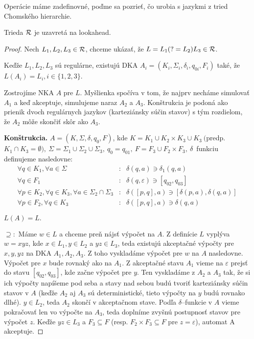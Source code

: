 Operácie máme zadefinovné, poďme sa pozrieť, čo urobia s jazykmi z tried Chomského hierarchie.

\begin{lema}
Trieda ${\cal R}$ je uzavretá na lookahead.
\end{lema}
\begin{proof}
Nech $ L_{1}, L_{2}, L_{3} \in {\cal R} $, chceme ukázať, že  $ L = L_{1}(?=L_{2})L_{3} \in {\cal R} $.

Keďže $ L_{1},L_{2},L_{3} $ sú regulárne, existujú DKA $ A_{i} = (K_{i},\Sigma_{i},\delta_{i},q_{0i},F_{i}) $ také, že $ L(A_{i})=L_{i}, i \in \lbrace 1,2,3\rbrace $. 

Zostrojíme NKA $ A $ pre $L$. Myšlienka spočíva v tom, že najprv necháme simulovať $A_1$ a keď akceptuje, simulujeme naraz $A_2$ a $A_3$. Konštrukcia je podoná ako prienik dvoch regulárnych jazykov (karteziánsky súčin stavov) s tým rozdielom, že $A_2$ môže skončiť skôr ako $A_3$.

\textbf{Konštrukcia.}  $ A = (K,\Sigma,\delta,q_{0},F) $, kde
$ K = K_{1} \cup K_{2} \times K_{3} \cup K_{3} ~ ( $predp. $ K_{1} \cap K_{3}= \emptyset), ~
\Sigma=\Sigma_{1}\cup\Sigma_{2}\cup\Sigma_{3}, ~ q_{0}=q_{01}, ~ F = F_{3} \cup F_{2} \times F_{3}, ~ \delta $~funkciu definujeme nasledovne:
\begin{eqnarray*}
\forall q \in K_{1}, \forall a \in \Sigma &:& \delta(q,a) \ni \delta_{1}(q,a) \\
\forall q \in F_{1} &:& \delta(q,\varepsilon ) \ni \left[ q_{02},q_{03} \right] \\
\forall p \in K_{2}, \forall q \in K_{3}, \forall a \in \Sigma_{2} \cap \Sigma_{3} &:& \delta( \left[ p,q \right] ,a) \ni \left[ \delta(p,a), \delta (q,a) \right] \\
\forall p \in F_2, \forall q \in K_3 &:& \delta(\left[p,q\right],a) \ni \delta(q,a) 
\end{eqnarray*}

$ L(A) = L. $

$ \supseteq: $ Máme $ w \in L $ a chceme preň nájsť výpočet na $A$. Z definície $L$ vyplýva $w=xyz$, kde $x \in L_1, y \in L_2$ a $yz \in L_3$, teda existujú akceptačné výpočty pre $x,y,yz$ na DKA $A_1,A_2,A_3$. Z toho vyskladáme výpočet pre $w$ na $A$ nasledovne. Výpočet pre $x$ bude rovnaký ako na $A_1$. Z akceptačné stavu $A_1$ vieme na $\varepsilon$ prejsť do stavu $\left[q_{02},q_{03}\right]$, kde začne výpočet pre $y$. Ten vyskladáme z $A_2$ a $A_3$ tak, že si ich výpočty napíšeme pod seba a stavy nad sebou budú tvoriť karteziánsky súčin stavov v $A$ (keďže $A_2$ aj $A_3$ sú deterministické, tieto výpočty na $y$ budú rovnako dlhé). $y \in L_2$, teda $A_2$ skončí v akceptačnom stave. Podľa $\delta$--funkcie v $A$ vieme pokračovať len vo výpočte na $A_3$, teda doplníme zvyšnú postupnosť stavov pre výpočet $z$. Keďže $yz \in L_3$ a $F_3\subseteq F$ (resp. $F_2\times F_3\subseteq F$ pre $z=\varepsilon$), automat A akceptuje. 


\end{proof}
